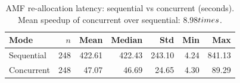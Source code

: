 \begin{table}[htbp]
\centering
\caption{AMF re-allocation latency: sequential vs concurrent (seconds). Mean speedup of concurrent over sequential: 8.98$\\times$.}
\label{tab:comparison}
\begin{tabular}{lrrrrrr}
\hline
Mode & $n$ & Mean & Median & Std & Min & Max \\
\hline
Sequential & 248 & 422.61 & 422.43 & 243.10 & 4.24 & 841.13 \\
Concurrent & 248 & 47.07 & 46.69 & 24.65 & 4.30 & 89.29 \\
\hline
\end{tabular}
\end{table}
